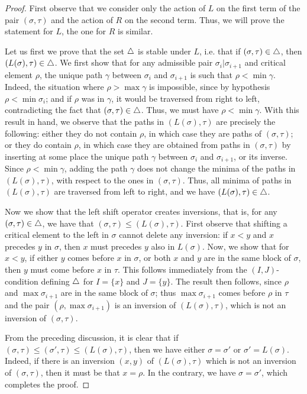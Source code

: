 \begin{proof}
First observe that we consider only the action of $L$ on the first term of the pair $(\sigma,\tau)$ and the action of $R$ on the second term. 
Thus, we will prove the statement for $L$, the one for $R$ is similar. 

Let us first we prove that the set $\triangle$ is stable under $L$, i.e. that if $(\sigma,\tau) \in \triangle$, then $(L(\sigma),\tau) \in \triangle$. 
We first show that for any admissible pair $\sigma_i | \sigma_{i+1}$ and critical element $\rho$, the unique path $\gamma$ between $\sigma_i$ and $\sigma_{i+1}$ is such that $\rho < \min \gamma$. 
Indeed, the situation where $\rho > \max \gamma$ is impossible, since by hypothesis $\rho < \min \sigma_i$; and if $\rho$ was in $\gamma$, it would be traversed from right to left, contradicting the fact that $(\sigma,\tau) \in \triangle$. 
Thus, we must have $\rho < \min \gamma$. 
With this result in hand, we observe that the paths in $(L(\sigma), \tau)$ are precisely the following: either they do not contain $\rho$, in which case they are paths of $(\sigma, \tau)$; or they do contain $\rho$, in which case they are obtained from paths in $(\sigma,\tau)$ by inserting at some place the unique path $\gamma$ between $\sigma_i$ and $\sigma_{i+1}$, or its inverse. 
Since $\rho < \min \gamma$, adding the path $\gamma$ does not change the minima of the paths in $(L(\sigma), \tau)$, with respect to the ones in $(\sigma, \tau)$.
Thus, all minima of paths in $(L(\sigma), \tau)$ are traversed from left to right, and we have $(L(\sigma), \tau) \in \triangle$.

Now we show that the left shift operator creates inversions, that is, for any $(\sigma, \tau) \in \triangle$, we have that $(\sigma,\tau) \leq (L(\sigma),\tau)$. 
First observe that shifting a critical element to the left in $\sigma$ cannot delete any inversion: if $x<y$ and $x$ precedes $y$ in $\sigma$, then $x$ must precedes $y$ also in $L(\sigma)$. 
Now, we show that for $x<y$, if either $y$ comes before $x$ in $\sigma$, or both $x$ and $y$ are in the same block of $\sigma$, then $y$ must come before $x$ in $\tau$. 
This follows immediately from the $(I,J)$-condition defining $\triangle$ for $I=\{x\}$ and $J=\{y\}$. 
The result then follows, since $\rho$ and $\max \sigma_{i+1}$ are in the same block of $\sigma$; thus $\max \sigma_{i+1}$ comes before $\rho$ in $\tau$ and the pair $(\rho,\max \sigma_{i+1})$ is an inversion of $(L(\sigma),\tau)$, which is not an inversion of $(\sigma,\tau)$. 

From the preceding discussion, it is clear that if $(\sigma,\tau) \leq (\sigma',\tau) \leq (L(\sigma),\tau)$, then we have either $\sigma=\sigma'$ or $\sigma'=L(\sigma)$. 
Indeed, if there is an inversion $(x,y)$ of $(L(\sigma),\tau)$ which is not an inversion of $(\sigma,\tau)$, then it must be that $x=\rho$. 
In the contrary, we have $\sigma=\sigma'$, which completes the proof. 
\end{proof}

